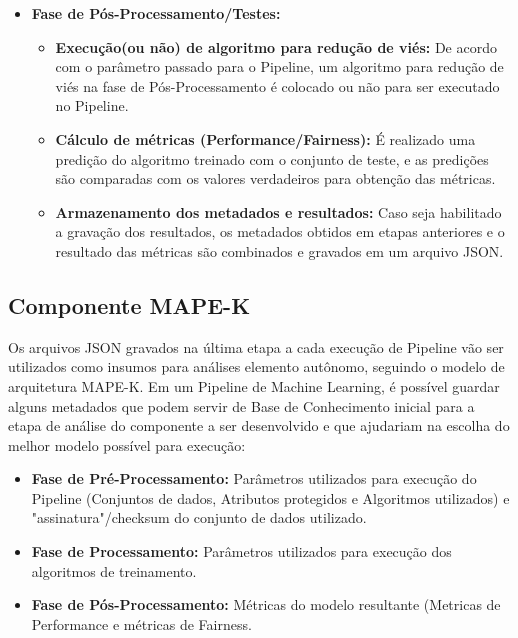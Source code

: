 \documentclass[portugues]{ic-tese}
\begin{document}
\begin{itemize}
\begin{itemize}
	\end{itemize}
\item \textbf{Fase de Pós-Processamento/Testes:}
	\begin{itemize}
	\item \textbf{Execução(ou não) de algoritmo para redução de viés:} De acordo com o parâmetro passado para o Pipeline, um algoritmo para redução de viés na fase de Pós-Processamento é colocado ou não para ser executado no Pipeline.
	\item \textbf{Cálculo de métricas (Performance/Fairness):} É realizado uma predição do algoritmo treinado com o conjunto de teste, e as predições são comparadas com os valores verdadeiros para obtenção das métricas.
	\item \textbf{Armazenamento dos metadados e resultados:} Caso seja habilitado a gravação dos resultados, os metadados obtidos em etapas anteriores e o resultado das métricas são combinados e gravados em um arquivo JSON.
	\end{itemize}
\end{itemize}

\subsection{Componente MAPE-K}

Os arquivos JSON gravados na última etapa a cada execução de Pipeline vão ser utilizados como insumos para análises elemento autônomo, seguindo o modelo de arquitetura MAPE-K. Em um Pipeline de Machine Learning, é possível guardar alguns metadados que podem servir de Base de Conhecimento inicial para a etapa de análise do componente a ser desenvolvido e que ajudariam na escolha do melhor modelo possível para execução:

\begin{itemize}
\item \textbf{Fase de Pré-Processamento:} Parâmetros utilizados para execução do Pipeline (Conjuntos de dados, Atributos protegidos e Algoritmos utilizados) e "assinatura"/checksum do conjunto de dados utilizado.
\item \textbf{Fase de Processamento:} Parâmetros utilizados para execução dos algoritmos de treinamento.
\item \textbf{Fase de Pós-Processamento:} Métricas do modelo resultante (Metricas de Performance e métricas de Fairness.
\end{itemize}
\end{document}
